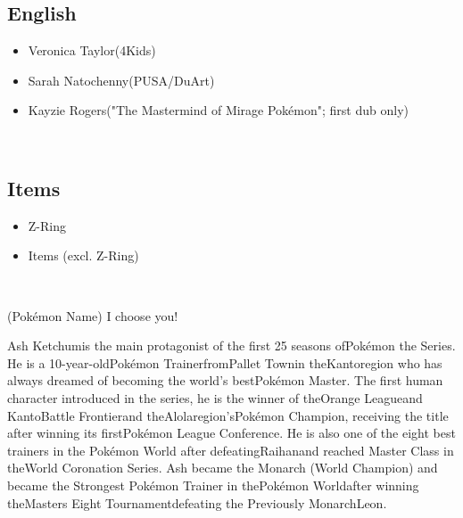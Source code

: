 \documentclass[a4paper,12pt]{article}
\begin{document}
\subsection*{English}\n\n\begin{itemize}
\item Veronica Taylor(4Kids)
\item Sarah Natochenny(PUSA/DuArt)
\item Kayzie Rogers("The Mastermind of Mirage Pokémon"; first dub only)
\end{itemize}\\ \par \vspace{0.5cm}

\subsection*{Items}\n\n\begin{itemize}
\item Z-Ring
\item Items (excl. Z-Ring)
\end{itemize}\\ \par \vspace{0.5cm}

(Pokémon Name) I choose you!\\ \par \vspace{0.5cm}

Ash Ketchumis the main protagonist of the first 25 seasons ofPokémon the Series. He is a 10-year-oldPokémon TrainerfromPallet Townin theKantoregion who has always dreamed of becoming the world's bestPokémon Master. The first human character introduced in the series, he is the winner of theOrange Leagueand KantoBattle Frontierand theAlolaregion'sPokémon Champion, receiving the title after winning its firstPokémon League Conference. He is also one of the eight best trainers in the Pokémon World after defeatingRaihanand reached Master Class in theWorld Coronation Series. Ash became the Monarch (World Champion) and became the Strongest Pokémon Trainer in thePokémon Worldafter winning theMasters Eight Tournamentdefeating the Previously MonarchLeon.\\ \par \vspace{0.5cm}
\end{document}
